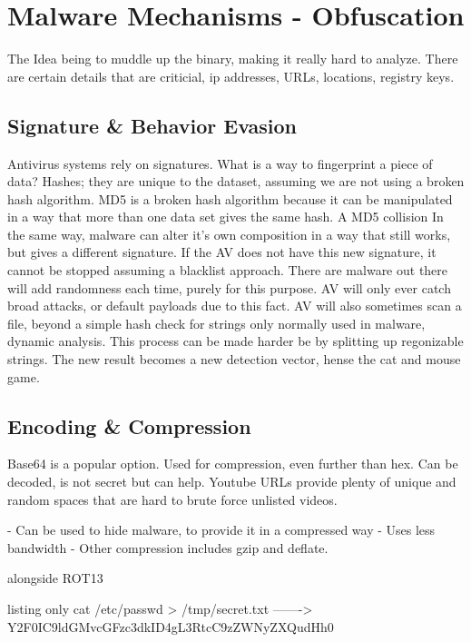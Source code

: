 
\chapter{Malware Mechanisms - Obfuscation}
The Idea being to muddle up the binary, making it really hard to analyze. There are certain details that are criticial, ip addresses, URLs, locations, registry keys.

\section{Signature \& Behavior Evasion}
Antivirus systems rely on signatures. What is a way to fingerprint a piece of data? Hashes; they are unique to the dataset, assuming we are not using a broken hash algorithm.
MD5 is a broken hash algorithm because it can be manipulated in a way that more than one data set gives the same hash. A MD5 collision
In the same way, malware can alter it's own composition in a way that still works, but gives a different signature. 
If the AV does not have this new signature, it cannot be stopped assuming a blacklist approach.
There are malware out there will add randomness each time, purely for this purpose. AV will only ever catch broad attacks, or default payloads due to this fact. AV will also sometimes scan a file,
beyond a simple hash check for strings only normally used in malware, dynamic analysis. This process can be made harder be by splitting up regonizable strings. The new result becomes a new detection vector, 
hense the cat and mouse game.

\section{Encoding \& Compression}
Base64 is a popular option. Used for compression, even further than hex. Can be decoded, is not secret but can help. 
Youtube URLs provide plenty of unique and random spaces that are hard to brute force unlisted videos.

- Can be used to hide malware, to provide it in a compressed way
- Uses less bandwidth
- Other compression includes gzip and deflate.

alongside ROT13

\begin{tcblisting}{listing only}
cat /etc/passwd > /tmp/secret.txt -------> Y2F0IC9ldGMvcGFzc3dkID4gL3RtcC9zZWNyZXQudHh0
\end{tcblisting}

